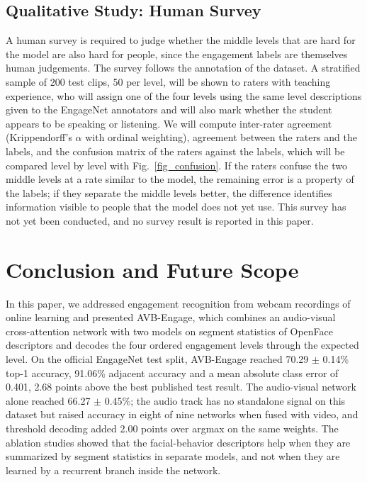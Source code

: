 \documentclass[journal]{IEEEtran}
\newcommand{\ournet}{AVB-Engage}
\begin{document}
\subsection{Qualitative Study: Human Survey}

A human survey is required to judge whether the middle levels that are hard for the model are also hard for people, since the engagement labels are themselves human judgements. The survey follows the annotation of the dataset. A stratified sample of 200 test clips, 50 per level, will be shown to raters with teaching experience, who will assign one of the four levels using the same level descriptions given to the EngageNet annotators and will also mark whether the student appears to be speaking or listening. We will compute inter-rater agreement (Krippendorff's $\alpha$ with ordinal weighting), agreement between the raters and the labels, and the confusion matrix of the raters against the labels, which will be compared level by level with Fig.~\ref{fig_confusion}. If the raters confuse the two middle levels at a rate similar to the model, the remaining error is a property of the labels; if they separate the middle levels better, the difference identifies information visible to people that the model does not yet use. This survey has not yet been conducted, and no survey result is reported in this paper.

\section{Conclusion and Future Scope}
\label{sec:conclusion}

In this paper, we addressed engagement recognition from webcam recordings of online learning and presented \ournet, which combines an audio-visual cross-attention network with two models on segment statistics of OpenFace descriptors and decodes the four ordered engagement levels through the expected level. On the official EngageNet test split, \ournet{} reached 70.29 $\pm$ 0.14\% top-1 accuracy, 91.06\% adjacent accuracy and a mean absolute class error of 0.401, 2.68 points above the best published test result. The audio-visual network alone reached 66.27 $\pm$ 0.45\%; the audio track has no standalone signal on this dataset but raised accuracy in eight of nine networks when fused with video, and threshold decoding added 2.00 points over argmax on the same weights. The ablation studies showed that the facial-behavior descriptors help when they are summarized by segment statistics in separate models, and not when they are learned by a recurrent branch inside the network.
\end{document}
